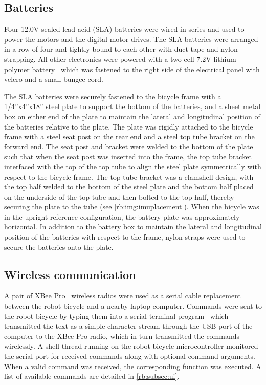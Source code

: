 \subsection{Batteries} \label{rb:subsec:batteries}
Four 12.0V sealed lead acid (SLA) batteries were wired in series and used to
power the motors and the digital motor drives. The SLA batteries were arranged
in a row of four and tightly bound to each other with duct tape and nylon
strapping. All other electronics were powered with a two-cell 7.2V lithium
polymer battery~\cite{Zippy5000} which was fastened to the right side of the
electrical panel with velcro and a small bungee cord.

The SLA batteries were securely fastened to the bicycle frame with a
1/4''x4''x18'' steel plate to support the bottom of the batteries, and a sheet
metal box on either end of the plate to maintain the lateral and longitudinal
position of the batteries relative to the plate. The plate was rigidly
attached to the bicycle frame with a steel seat post on the rear end and a
steel top tube bracket on the forward end. The seat post and bracket were
welded to the bottom of the plate such that when the seat post was inserted
into the frame, the top tube bracket interfaced with the top of the top tube to
align the steel plate symmetrically with respect to the bicycle frame. The top
tube bracket was a clamshell design, with the top half welded to the bottom of
the steel plate and the bottom half placed on the underside of the top tube and
then bolted to the top half, thereby securing the plate to the tube (see
\autoref{rb:img:imuplacement}). When the bicycle was in the upright reference 
configuration, the battery plate was approximately horizontal. In addition to
the battery box to maintain the lateral and longitudinal position of the
batteries with respect to the frame, nylon straps were used to secure the
batteries onto the plate.

\subsection{Wireless communication} \label{rb:subsec:wireless}
A pair of XBee Pro~\cite{XBeePro} wireless radios were used as a serial cable
replacement between the robot bicycle and a nearby laptop computer. Commands
were sent to the robot bicycle by typing them into a serial terminal
program~\cite{moserial} which transmitted the text as a simple character stream
through the USB port of the computer to the XBee Pro radio, which in turn
transmitted the commands wirelessly. A shell thread running on the robot
bicycle microcontroller monitored the serial port for received commands along
with optional command arguments. When a valid command was received, the
corresponding function was executed. A list of available commands are detailed
in \autoref{rb:subsec:ui}.


